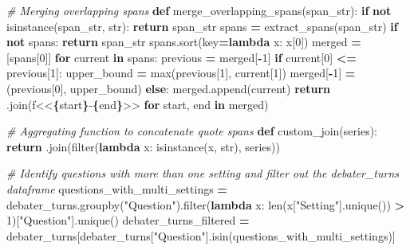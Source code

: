 \documentclass[
]{article}
\newenvironment{Shaded}{\begin{snugshade}}{\end{snugshade}}
\newcommand{\BuiltInTok}[1]{#1}
\newcommand{\CommentTok}[1]{\textcolor[rgb]{0.56,0.35,0.01}{\textit{#1}}}
\newcommand{\ControlFlowTok}[1]{\textcolor[rgb]{0.13,0.29,0.53}{\textbf{#1}}}
\newcommand{\DecValTok}[1]{\textcolor[rgb]{0.00,0.00,0.81}{#1}}
\newcommand{\KeywordTok}[1]{\textcolor[rgb]{0.13,0.29,0.53}{\textbf{#1}}}
\newcommand{\NormalTok}[1]{#1}
\newcommand{\OperatorTok}[1]{\textcolor[rgb]{0.81,0.36,0.00}{\textbf{#1}}}
\newcommand{\SpecialCharTok}[1]{\textcolor[rgb]{0.81,0.36,0.00}{\textbf{#1}}}
\newcommand{\SpecialStringTok}[1]{\textcolor[rgb]{0.31,0.60,0.02}{#1}}
\newcommand{\StringTok}[1]{\textcolor[rgb]{0.31,0.60,0.02}{#1}}
\begin{document}
\begin{Shaded}
\begin{Highlighting}[]
\CommentTok{\# Merging overlapping spans}
\KeywordTok{def}\NormalTok{ merge\_overlapping\_spans(span\_str):}
    \ControlFlowTok{if} \KeywordTok{not} \BuiltInTok{isinstance}\NormalTok{(span\_str, }\BuiltInTok{str}\NormalTok{):}
        \ControlFlowTok{return}\NormalTok{ span\_str}
\NormalTok{    spans }\OperatorTok{=}\NormalTok{ extract\_spans(span\_str)}
    \ControlFlowTok{if} \KeywordTok{not}\NormalTok{ spans:}
        \ControlFlowTok{return}\NormalTok{ span\_str}
\NormalTok{    spans.sort(key}\OperatorTok{=}\KeywordTok{lambda}\NormalTok{ x: x[}\DecValTok{0}\NormalTok{])}
\NormalTok{    merged }\OperatorTok{=}\NormalTok{ [spans[}\DecValTok{0}\NormalTok{]]}
    \ControlFlowTok{for}\NormalTok{ current }\KeywordTok{in}\NormalTok{ spans:}
\NormalTok{        previous }\OperatorTok{=}\NormalTok{ merged[}\OperatorTok{{-}}\DecValTok{1}\NormalTok{]}
        \ControlFlowTok{if}\NormalTok{ current[}\DecValTok{0}\NormalTok{] }\OperatorTok{\textless{}=}\NormalTok{ previous[}\DecValTok{1}\NormalTok{]:}
\NormalTok{            upper\_bound }\OperatorTok{=} \BuiltInTok{max}\NormalTok{(previous[}\DecValTok{1}\NormalTok{], current[}\DecValTok{1}\NormalTok{])}
\NormalTok{            merged[}\OperatorTok{{-}}\DecValTok{1}\NormalTok{] }\OperatorTok{=}\NormalTok{ (previous[}\DecValTok{0}\NormalTok{], upper\_bound)}
        \ControlFlowTok{else}\NormalTok{:}
\NormalTok{            merged.append(current)}
    \ControlFlowTok{return} \StringTok{\textquotesingle{} \textquotesingle{}}\NormalTok{.join(}\SpecialStringTok{f\textquotesingle{}\textless{}\textless{}}\SpecialCharTok{\{}\NormalTok{start}\SpecialCharTok{\}}\SpecialStringTok{{-}}\SpecialCharTok{\{}\NormalTok{end}\SpecialCharTok{\}}\SpecialStringTok{\textgreater{}\textgreater{}\textquotesingle{}} \ControlFlowTok{for}\NormalTok{ start, end }\KeywordTok{in}\NormalTok{ merged)}

\CommentTok{\# Aggregating function to concatenate quote spans}
\KeywordTok{def}\NormalTok{ custom\_join(series):}
    \ControlFlowTok{return} \StringTok{\textquotesingle{} \textquotesingle{}}\NormalTok{.join(}\BuiltInTok{filter}\NormalTok{(}\KeywordTok{lambda}\NormalTok{ x: }\BuiltInTok{isinstance}\NormalTok{(x, }\BuiltInTok{str}\NormalTok{), series))}

\CommentTok{\# Identify questions with more than one setting and filter out the debater\_turns dataframe}
\NormalTok{questions\_with\_multi\_settings }\OperatorTok{=}\NormalTok{ debater\_turns.groupby(}\StringTok{"Question"}\NormalTok{).}\BuiltInTok{filter}\NormalTok{(}\KeywordTok{lambda}\NormalTok{ x: }\BuiltInTok{len}\NormalTok{(x[}\StringTok{"Setting"}\NormalTok{].unique()) }\OperatorTok{\textgreater{}} \DecValTok{1}\NormalTok{)[}\StringTok{"Question"}\NormalTok{].unique()}
\NormalTok{debater\_turns\_filtered }\OperatorTok{=}\NormalTok{ debater\_turns[debater\_turns[}\StringTok{"Question"}\NormalTok{].isin(questions\_with\_multi\_settings)]}


\end{Highlighting}
\end{Shaded}
\end{document}
